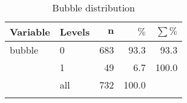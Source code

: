 \begingroup\footnotesize
\begin{longtable}{ll|rrr}
 \textbf{Variable} & \textbf{Levels} & $\mathbf{n}$ & $\mathbf{\%}$ & $\mathbf{\sum \%}$ \\ 
  \hline
bubble & 0 & 683 & 93.3 & 93.3 \\ 
   & 1 & 49 & 6.7 & 100.0 \\ 
   \hline
 & all & 732 & 100.0 &  \\ 
   \hline
\hline
\hline
\caption{Bubble distribution} 
\label{tab:imbalance}
\end{longtable}
\endgroup

